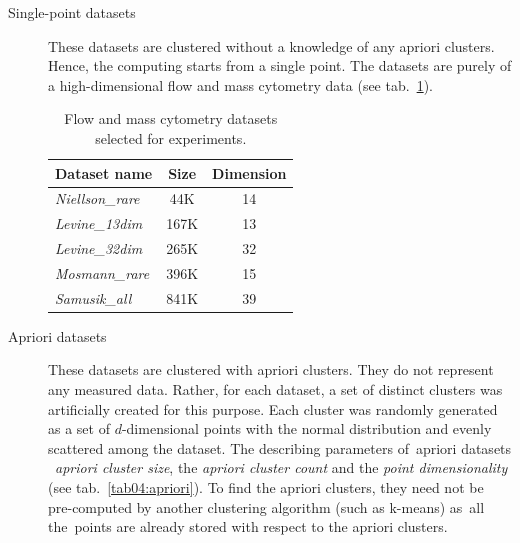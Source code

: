 \begin{description}
	\item[Single-point datasets] These datasets are clustered without a knowledge of any apriori clusters. Hence, the computing starts from a single point. The datasets are purely of a high-dimensional flow and mass cytometry data \cite{flowrepo} (see tab.~\ref{tab04:single}).
	
	\begin{table}
		\centering
		\begin{tabular}{lcc}
			\toprule
			\textbf{Dataset name} & \textbf{Size} & \textbf{Dimension} \\ \midrule
			\emph{Niellson\_rare} &      44K      &         14         \\
			\emph{Levine\_13dim}  &     167K      &         13         \\
			\emph{Levine\_32dim}  &     265K      &         32         \\
			\emph{Mosmann\_rare}  &     396K      &         15         \\
			\emph{Samusik\_all}   &     841K      &         39         \\ \bottomrule
		\end{tabular}
	\caption{Flow and mass cytometry datasets selected for experiments.}
	\label{tab04:single}
	\end{table}

	\item[Apriori datasets] These datasets are clustered with apriori clusters. They do not represent any measured data. Rather, for each dataset, a set of distinct clusters was artificially created for this purpose. Each cluster was randomly generated as a set of $d$-dimensional points with the normal distribution and evenly scattered among the dataset. The describing parameters of~apriori datasets \ \emph{apriori cluster size}, the \emph{apriori cluster count} and the \emph{point dimensionality} (see tab.~\ref{tab04:apriori}). To find the apriori clusters, they need not be pre-computed by another clustering algorithm (such as k-means) as~all the~points are already stored with respect to the apriori clusters.
	

\end{description}

